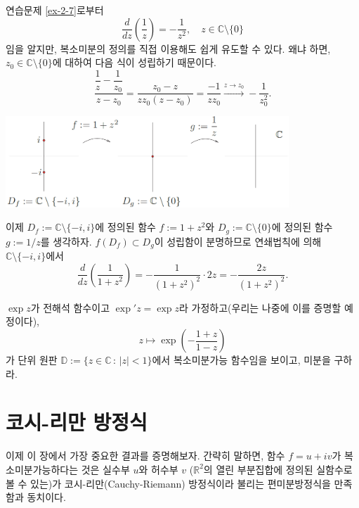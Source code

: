 \begin{saltexample}[label=example-2-4]{}{}
연습문제 \ref{ex-2-7}로부터
\[
\dfrac d{dz} \left(\dfrac 1z \right) = - \dfrac 1{z^2}, \quad
z\in \mathbb C \setminus \{0\}
\]
임을 알지만, 복소미분의 정의를 직접 이용해도 쉽게 유도할 수 있다. 왜냐 하면,
$z_0\in \mathbb C \setminus \{0\}$에 대하여 다음 식이 성립하기 때문이다.
\[
\dfrac{\dfrac 1z - \dfrac1{z_0}}{z-z_0} = \dfrac{z_0 - z}{zz_0(z-z_0)}
= \dfrac{-1}{zz_0} \xrightarrow{z\to z_0} - \dfrac 1{z_0^2}.
\] 
\begin{center}
\includegraphics[width=0.8\textwidth]{./SaltChapter/figs/fig-2-4}
\end{center}
\label{fig-2-4}
\saltfigskip
이제 $D_f:=\mathbb C \setminus \{-i,i\}$에 정의된 함수 $f:= 1+z^2$와
$D_g:=\mathbb C \setminus \{0\}$에 정의된 함수 $g:=1/z$를 생각하자.
$f(D_f) \subset D_g$이 성립함이 분명하므로 연쇄법칙에 의해
$\mathbb C \setminus \{-i, i\}$에서
\[
\dfrac d{dz} \left( \dfrac 1{1+z^2} \right) = - \dfrac 1{(1+z^2)^2}\cdot 2z
= - \dfrac{2z}{(1+z^2)^2}.
\]
\end{saltexample}

\begin{salt_exercise} \label{ex-2-8}
$\exp z$가 전해석 함수이고 $\exp' z = \exp z$라 가정하고(우리는 나중에 이를 증명할 예정이다),
\[
z \mapsto \exp \left( - \dfrac{1+z}{1-z} \right)
\]
가 단위 원판 $\mathbb D := \{ z \in \mathbb C \,:\, |z|<1 \}$에서
복소미분가능 함수임을 보이고, 미분을 구하라.
\end{salt_exercise}

\section{코시-리만 방정식}

이제 이 장에서 가장 중요한 결과를 증명해보자.
간략히 말하면, 함수  $f=u+iv$가 복소미분가능하다는 것은
실수부 $u$와 허수부 $v$ ($\mathbb R^2$의 열린 부분집합에 정의된 실함수로 볼 수 있는)가
코시-리만(Cauchy-Riemann) 방정식이라 불리는 편미분방정식을 만족함과 동치이다. 

